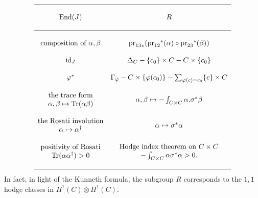 \documentclass{stacks-project}
\theoremstyle{plain}
\theoremstyle{definition}
\theoremstyle{remark}
\numberwithin{equation}{subsection}
\begin{document}
$$
\begin{matrix}
\hline & \\
\text{End}(J) & R \\
& \\
\hline & \\
\text{composition of }\alpha, \beta &
{\text{pr}_{13}}_* ({\text{pr}_{12}}^*(\alpha) \circ {\text{pr}_{23}}^*(\beta))
\\
& \\
\text{id}_J &
\Delta_C - \{c_0\} \times C - C \times \{c_0\} \\
& \\
\varphi^* &
\Gamma_\varphi - C \times \{\varphi(c_0)\}
- \sum_{\varphi(c) = c_0} \{c\} \times C \\
& \\
{
\begin{matrix}
\text{the trace form} \\
\alpha, \beta \mapsto \text{Tr}(\alpha \beta)
\end{matrix}
}
&
\alpha, \beta \mapsto - \int_{C \times C} \alpha . \sigma^*\beta
\\
& \\
{
\begin{matrix}
\text{the Rosati involution} \\
\alpha \mapsto \alpha^\dagger
\end{matrix}
}
&
\alpha \mapsto \sigma^*\alpha
\\
& \\
{
\begin{matrix}
\text{positivity of Rosati} \\
\text{Tr}(\alpha\alpha^\dagger) > 0
\end{matrix}
}
&
{
\begin{matrix}
\text{Hodge index theorem on }C \times C \\
- \int_{C \times C} \alpha \sigma^*\alpha > 0.
\end{matrix}
}
\\
& \\
\hline 
\end{matrix}
$$
In fact, in light of the Kunneth formula, the subgroup $R$ corresponds to the
$1, 1$ hodge classes in $H^1(C)\otimes H^1(C)$.
\end{document}
